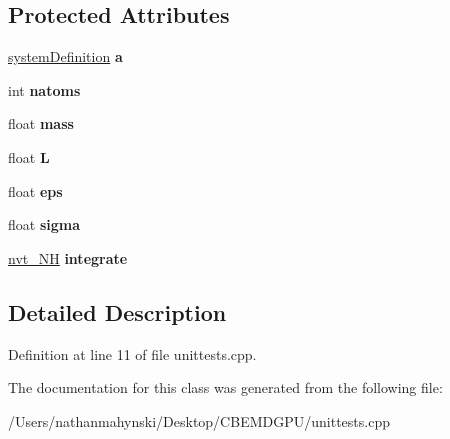\subsection*{Protected Attributes}
\begin{DoxyCompactItemize}
\item 
\hypertarget{class_system_test_a5655f7f306ac99a2defe7504b593886c}{\hyperlink{classsystem_definition}{system\-Definition} {\bfseries a}}\label{class_system_test_a5655f7f306ac99a2defe7504b593886c}

\item 
\hypertarget{class_system_test_a55d8b8e8bd1ad2755e9a560d1262d57e}{int {\bfseries natoms}}\label{class_system_test_a55d8b8e8bd1ad2755e9a560d1262d57e}

\item 
\hypertarget{class_system_test_a01059fcb317cac6e522903a0f5f24741}{float {\bfseries mass}}\label{class_system_test_a01059fcb317cac6e522903a0f5f24741}

\item 
\hypertarget{class_system_test_a51339a0790891b5b4e2b8689f8bb6b4e}{float {\bfseries L}}\label{class_system_test_a51339a0790891b5b4e2b8689f8bb6b4e}

\item 
\hypertarget{class_system_test_a5ec2ee91805410518f5662b6b41e395b}{float {\bfseries eps}}\label{class_system_test_a5ec2ee91805410518f5662b6b41e395b}

\item 
\hypertarget{class_system_test_a2022b261d402b0617620e0b1745a25bc}{float {\bfseries sigma}}\label{class_system_test_a2022b261d402b0617620e0b1745a25bc}

\item 
\hypertarget{class_system_test_a970b77c65ebefa8d207538700ebdd4a0}{\hyperlink{classnvt___n_h}{nvt\-\_\-\-N\-H} {\bfseries integrate}}\label{class_system_test_a970b77c65ebefa8d207538700ebdd4a0}

\end{DoxyCompactItemize}


\subsection{Detailed Description}


Definition at line 11 of file unittests.\-cpp.



The documentation for this class was generated from the following file\-:\begin{DoxyCompactItemize}
\item 
/\-Users/nathanmahynski/\-Desktop/\-C\-B\-E\-M\-D\-G\-P\-U/unittests.\-cpp\end{DoxyCompactItemize}
